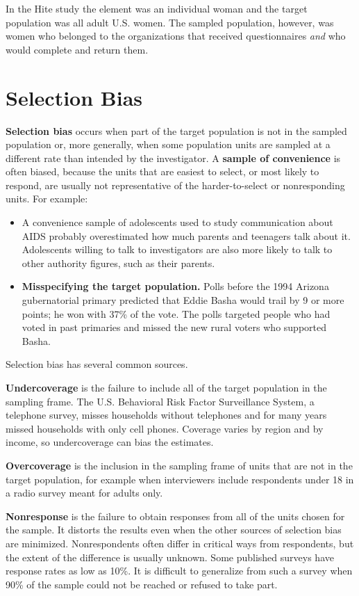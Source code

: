 \documentclass[
  letterpaper,
  DIV=11,
  numbers=noendperiod]{scrreprt}
\providecommand{\tightlist}{%
  \setlength{\itemsep}{0pt}\setlength{\parskip}{0pt}}
\renewcommand{\[}{\begin{equation}}
\renewcommand{\]}{\end{equation}}
\begin{document}
In the Hite study the element was an individual woman and the target
population was all adult U.S. women. The sampled population, however,
was women who belonged to the organizations that received questionnaires
\emph{and} who would complete and return them.

\section{Selection Bias}\label{sec-intro-selection-bias}

\textbf{Selection bias} occurs when part of the target population is not
in the sampled population or, more generally, when some population units
are sampled at a different rate than intended by the investigator. A
\textbf{sample of convenience} is often biased, because the units that
are easiest to select, or most likely to respond, are usually not
representative of the harder-to-select or nonresponding units. For
example:

\begin{itemize}
\tightlist
\item
  A convenience sample of adolescents used to study communication about
  AIDS probably overestimated how much parents and teenagers talk about
  it. Adolescents willing to talk to investigators are also more likely
  to talk to other authority figures, such as their parents.
\item
  \textbf{Misspecifying the target population.} Polls before the 1994
  Arizona gubernatorial primary predicted that Eddie Basha would trail
  by 9 or more points; he won with 37\% of the vote. The polls targeted
  people who had voted in past primaries and missed the new rural voters
  who supported Basha.
\end{itemize}

Selection bias has several common sources.

\textbf{Undercoverage} is the failure to include all of the target
population in the sampling frame. The U.S. Behavioral Risk Factor
Surveillance System, a telephone survey, misses households without
telephones and for many years missed households with only cell phones.
Coverage varies by region and by income, so undercoverage can bias the
estimates.

\textbf{Overcoverage} is the inclusion in the sampling frame of units
that are not in the target population, for example when interviewers
include respondents under 18 in a radio survey meant for adults only.

\textbf{Nonresponse} is the failure to obtain responses from all of the
units chosen for the sample. It distorts the results even when the other
sources of selection bias are minimized. Nonrespondents often differ in
critical ways from respondents, but the extent of the difference is
usually unknown. Some published surveys have response rates as low as
10\%. It is difficult to generalize from such a survey when 90\% of the
sample could not be reached or refused to take part.
\end{document}
